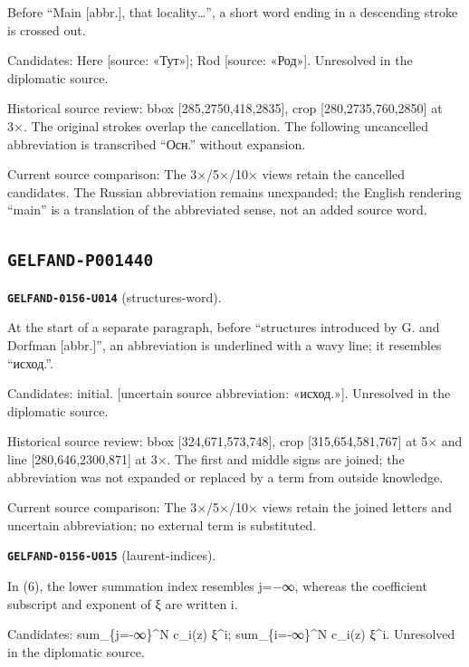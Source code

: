 Before “Main [abbr.], that locality…”, a short word ending in a descending stroke is crossed out.\par
Candidates: Here [source: «Тут»]; Rod [source: «Род»]. Unresolved in the diplomatic source.\par
Historical source review: bbox [285,2750,418,2835], crop [280,2735,760,2850] at 3×. The original strokes overlap the cancellation. The following uncancelled abbreviation is transcribed “Осн.” without expansion.\par
Current source comparison: The 3×/5×/10× views retain the cancelled candidates. The Russian abbreviation remains unexpanded; the English rendering “main” is a translation of the abbreviated sense, not an added source word.\par\medskip
\subsection*{\texttt{GELFAND-P001440}}
\par\noindent\leavevmode{}\label{GELFAND-0156-U014}\label{GELFAND-P001440:structures-word}\textbf{\texttt{GELFAND-0156-U014}} (structures-word).\nopagebreak[4]\par
At the start of a separate paragraph, before “structures introduced by G. and Dorfman [abbr.]”, an abbreviation is underlined with a wavy line; it resembles “исход.”.\par
Candidates: initial. [uncertain source abbreviation: «исход.»]. Unresolved in the diplomatic source.\par
Historical source review: bbox [324,671,573,748], crop [315,654,581,767] at 5× and line [280,646,2300,871] at 3×. The first and middle signs are joined; the abbreviation was not expanded or replaced by a term from outside knowledge.\par
Current source comparison: The 3×/5×/10× views retain the joined letters and uncertain abbreviation; no external term is substituted.\par\medskip
\par\noindent\leavevmode{}\label{GELFAND-0156-U015}\label{GELFAND-P001440:laurent-indices}\textbf{\texttt{GELFAND-0156-U015}} (laurent-indices).\nopagebreak[4]\par
In (6), the lower summation index resembles j=−∞, whereas the coefficient subscript and exponent of ξ are written i.\par
Candidates: sum\_\{j=-∞\}\textasciicircum{}N c\_i(z) ξ\textasciicircum{}i; sum\_\{i=-∞\}\textasciicircum{}N c\_i(z) ξ\textasciicircum{}i. Unresolved in the diplomatic source.\par
